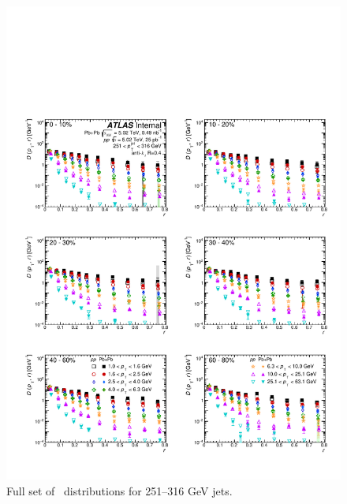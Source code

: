 \begin{figure}[h]
\includegraphics[width=1.0\textwidth]{figures/results/DpT_dR_jet10.pdf}
\caption{Full set of \Dptr\ distributions for 251--316 GeV jets.}
\label{fig:fullset_dptr_j10}
\end{figure}


